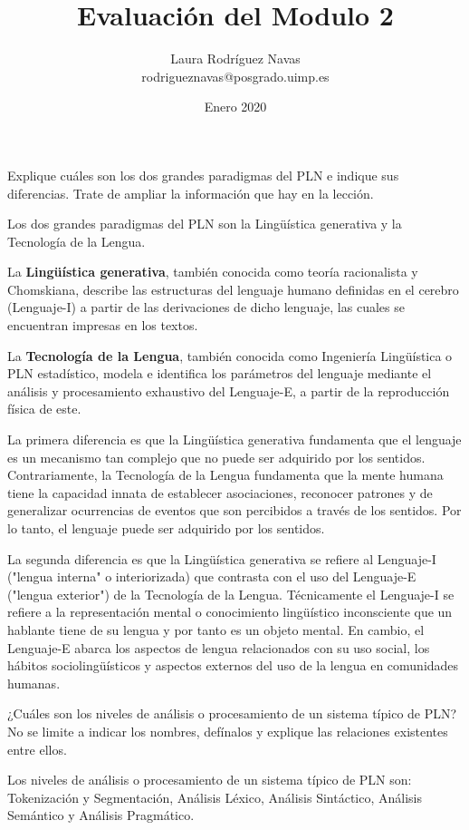 \documentclass{exam}
\title{Evaluación del Modulo 2}
\author{Laura Rodríguez Navas \\ rodrigueznavas@posgrado.uimp.es}
\date{Enero 2020}
\begin{document}
	
\maketitle

\begin{questions}
\question Explique cuáles son los dos grandes paradigmas del PLN e indique sus diferencias. Trate de ampliar la información que hay en la lección.

Los dos grandes paradigmas del PLN son la Lingüística generativa y la Tecnología de la Lengua.

La {\bf Lingüística generativa}, también conocida como teoría racionalista y Chomskiana, describe las estructuras del lenguaje humano definidas en el cerebro (Lenguaje-I) a partir de las derivaciones de dicho lenguaje, las cuales se encuentran
impresas en los textos.
	
La {\bf Tecnología de la Lengua}, también conocida como Ingeniería Lingüística o PLN estadístico, modela e identifica los parámetros del lenguaje mediante el análisis y procesamiento exhaustivo del Lenguaje-E, a partir de la reproducción física de este.

La primera diferencia es que la Lingüística generativa fundamenta que el lenguaje es un mecanismo tan complejo que no puede ser adquirido por los sentidos. Contrariamente, la Tecnología de la Lengua fundamenta que la mente humana tiene la capacidad innata de establecer asociaciones, reconocer patrones y de generalizar ocurrencias de eventos que son percibidos a través de los sentidos. Por lo tanto, el lenguaje puede ser adquirido por los sentidos.

La segunda diferencia es que la Lingüística generativa se refiere al Lenguaje-I ("lengua interna" o interiorizada) que contrasta con el uso del Lenguaje-E ("lengua exterior") de la Tecnología de la Lengua. Técnicamente el Lenguaje-I se refiere a la representación mental o conocimiento lingüístico inconsciente que un hablante tiene de su lengua y por tanto es un objeto mental. En cambio, el Lenguaje-E abarca los aspectos de lengua relacionados con su uso social, los hábitos sociolingüísticos y aspectos externos del uso de la lengua en comunidades humanas. 

\question ¿Cuáles son los niveles de análisis o procesamiento de un sistema típico de PLN? No se limite a indicar los nombres, defínalos y explique las relaciones existentes entre ellos.

Los niveles de análisis o procesamiento de un sistema típico de PLN son: Tokenización y Segmentación, Análisis Léxico, Análisis Sintáctico, Análisis Semántico y Análisis Pragmático.


\end{questions}
\end{document}
